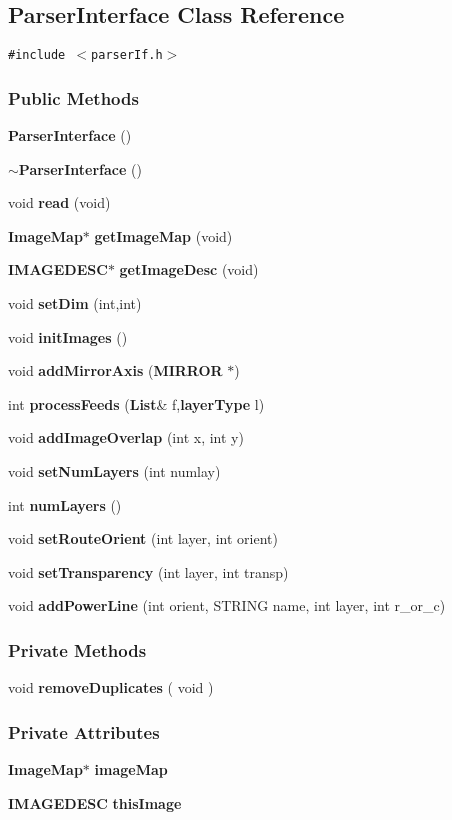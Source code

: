 \subsection{Parser\-Interface  Class Reference}
\label{ParserInterface}
{\tt \#include $<$parser\-If.h$>$}

\subsubsection*{Public Methods}
\begin{CompactItemize}
\item 
{\bf Parser\-Interface} ()
\item 
{\bf $\sim$Parser\-Interface} ()
\item 
void {\bf read} (void)
\item 
{\bf Image\-Map}$\ast$ {\bf get\-Image\-Map} (void)
\item 
{\bf IMAGEDESC}$\ast$ {\bf get\-Image\-Desc} (void)
\item 
void {\bf set\-Dim} (int,int)
\item 
void {\bf init\-Images} ()
\item 
void {\bf add\-Mirror\-Axis} ({\bf MIRROR} $\ast$)
\item 
int {\bf process\-Feeds} ({\bf List}\& f,{\bf layer\-Type} l)
\item 
void {\bf add\-Image\-Overlap} (int x, int y)
\item 
void {\bf set\-Num\-Layers} (int numlay)
\item 
int {\bf num\-Layers} ()
\item 
void {\bf set\-Route\-Orient} (int layer, int orient)
\item 
void {\bf set\-Transparency} (int layer, int transp)
\item 
void {\bf add\-Power\-Line} (int orient, STRING name, int layer, int r\_\-or\_\-c)
\end{CompactItemize}
\subsubsection*{Private Methods}
\begin{CompactItemize}
\item 
void {\bf remove\-Duplicates} ( void )
\end{CompactItemize}
\subsubsection*{Private Attributes}
\begin{CompactItemize}
\item 
{\bf Image\-Map}$\ast$ {\bf image\-Map}
\item 
{\bf IMAGEDESC} {\bf this\-Image}
\end{CompactItemize}


